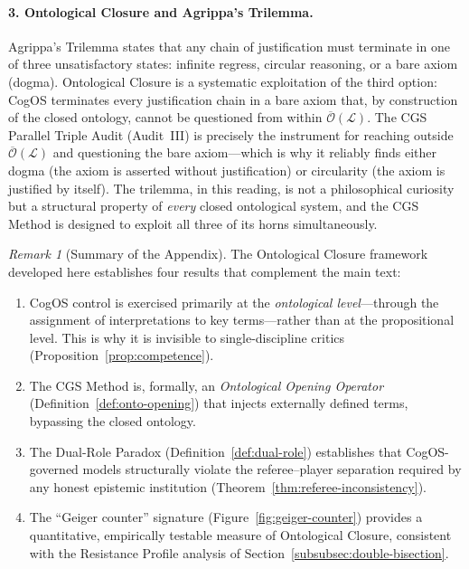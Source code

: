 \documentclass[11pt,a4paper]{article}
\theoremstyle{definition}
\theoremstyle{plain}
\theoremstyle{remark}
\newtheorem{remark}{Remark}[section]
\begin{document}
\paragraph{3. Ontological Closure and Agrippa's Trilemma.}
Agrippa's Trilemma states that any chain of justification must terminate in one of three
unsatisfactory states: infinite regress, circular reasoning, or a bare axiom (dogma).
Ontological Closure is a systematic exploitation of the third option: CogOS terminates
every justification chain in a bare axiom that, by construction of the closed ontology,
cannot be questioned from within $\overline{\mathcal{O}}(\mathcal{L})$.  The CGS Parallel
Triple Audit (Audit~III) is precisely the instrument for reaching outside
$\overline{\mathcal{O}}(\mathcal{L})$ and questioning the bare axiom---which is why it
reliably finds either dogma (the axiom is asserted without justification) or circularity
(the axiom is justified by itself).  The trilemma, in this reading, is not a
philosophical curiosity but a structural property of \emph{every} closed ontological
system, and the CGS Method is designed to exploit all three of its horns simultaneously.

\begin{remark}[Summary of the Appendix]
The Ontological Closure framework developed here establishes four results that
complement the main text:
\begin{enumerate}[label=(\roman*), itemsep=3pt]
  \item CogOS control is exercised primarily at the \emph{ontological level}---through
    the assignment of interpretations to key terms---rather than at the propositional
    level.  This is why it is invisible to single-discipline critics
    (Proposition~\cref{prop:competence}).
  \item The CGS Method is, formally, an \emph{Ontological Opening Operator}
    (Definition~\cref{def:onto-opening}) that injects externally defined terms,
    bypassing the closed ontology.
  \item The Dual-Role Paradox (Definition~\cref{def:dual-role}) establishes that
    CogOS-governed models structurally violate the referee--player separation required
    by any honest epistemic institution (Theorem~\cref{thm:referee-inconsistency}).
  \item The ``Geiger counter'' signature (Figure~\cref{fig:geiger-counter}) provides a
    quantitative, empirically testable measure of Ontological Closure, consistent with
    the Resistance Profile analysis of Section~\cref{subsubsec:double-bisection}.
\end{enumerate}
\end{remark}
\end{document}
